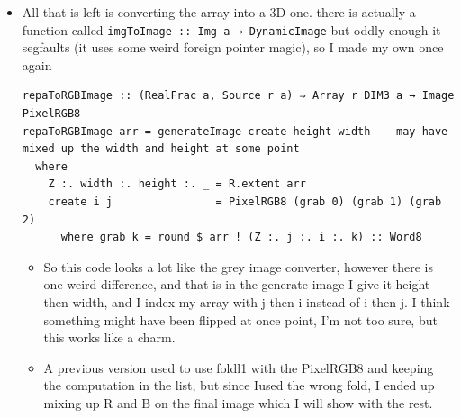 \documentclass{article}
\begin{document}
\begin{enumerate}
\begin{enumerate}
\begin{itemize}
\item All that is left is converting the array into a 3D one. there is
actually a function called \texttt{imgToImage :: Img a → DynamicImage} but
oddly enough it segfaults (it uses some weird foreign pointer
magic), so I made my own once again
\begin{verbatim}
repaToRGBImage :: (RealFrac a, Source r a) ⇒ Array r DIM3 a → Image PixelRGB8
repaToRGBImage arr = generateImage create height width -- may have mixed up the width and height at some point
  where
    Z :. width :. height :. _ = R.extent arr
    create i j                = PixelRGB8 (grab 0) (grab 1) (grab 2)
      where grab k = round $ arr ! (Z :. j :. i :. k) :: Word8
\end{verbatim}

\begin{itemize}
\item So this code looks a lot like the grey image converter, however
there is one weird difference, and that is in the generate image I
give it height then width, and Ι index my array with j then i
instead of i then j. I think something might have been flipped at
once point, I'm not too sure, but this works like a charm.

\item A previous version used to use foldl1 with the PixelRGB8 and keeping
the computation in the list, but since Ιused the wrong fold, I
ended up mixing up R and B on the final image which I will show with
the rest.
\end{itemize}


\end{itemize}
\end{enumerate}
\end{enumerate}
\end{document}
